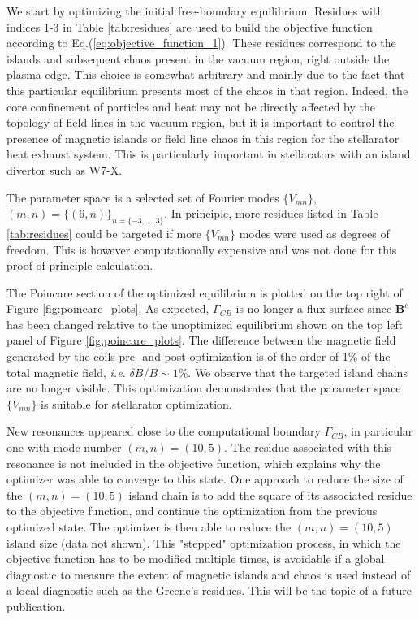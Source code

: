 We start by optimizing the initial free-boundary equilibrium. Residues with indices 1-3 in Table \ref{tab:residues} are used to build the objective function according to Eq.(\ref{eq:objective_function_1}). These residues correspond to the islands and subsequent chaos present in the vacuum region, right outside the plasma edge. This choice is somewhat arbitrary and mainly due to the fact that this particular equilibrium presents most of the chaos in that region. Indeed, the core confinement of particles and heat may not be directly affected by the topology of field lines in the vacuum region, but it is important to control the presence of magnetic islands or field line chaos in this region for the stellarator heat exhaust system. This is particularly important in stellarators with an island divertor such as W7-X\cite{Geiger2015}.

The parameter space is a selected set of Fourier modes $\{V_{mn}\}$,  $(m,n)=\{(6,n)\}_{n=\{-3,\ldots,3\}}$. In principle, more residues listed in Table \ref{tab:residues} could be targeted if more $\{V_{mn}\}$ modes were used as degrees of freedom. This is however computationally expensive and was not done for this proof-of-principle calculation.

The Poincare section of the optimized equilibrium is plotted on the top right of Figure \ref{fig:poincare_plots}. As expected, $\Gamma_{CB}$ is no longer a flux surface since $\mathbf{B}^c$ has been changed relative to the unoptimized equilibrium shown on the top left panel of Figure \ref{fig:poincare_plots}. The difference between the magnetic field generated by the coils pre- and post-optimization is of the order of 1\% of the total magnetic field, \textit{i.e.} $\delta B/B \sim 1\%$. We observe that the targeted island chains are no longer visible. This optimization demonstrates that the parameter space $\{V_{mn}\}$ is suitable for stellarator optimization.

New resonances appeared close to the computational boundary $\Gamma_{CB}$, in particular one with mode number $(m,n)=(10,5)$. The residue associated with this resonance is not included in the objective function, which explains why the optimizer was able to converge to this state. One approach to reduce the size of the $(m,n)=(10,5)$ island chain is to add the square of its associated residue to the objective function, and continue the optimization from the previous optimized state. The optimizer is then able to reduce the $(m,n)=(10,5)$ island size (data not shown). This "stepped" optimization process, in which the objective function has to be modified multiple times, is avoidable if a global diagnostic to measure the extent of magnetic islands and chaos is used instead of a local diagnostic such as the Greene's residues. This will be the topic of a future publication.

